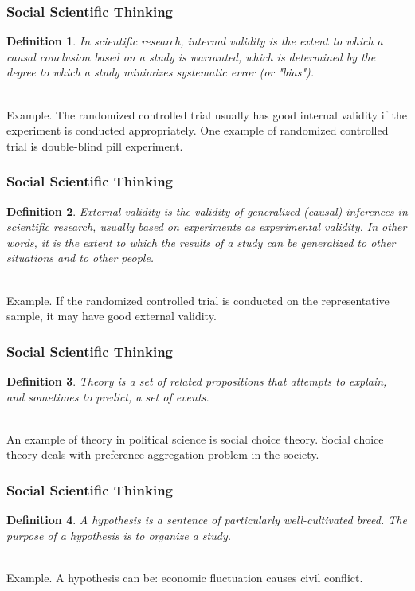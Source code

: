 \documentclass{beamer}
\newtheorem{defn}{Definition}
\numberwithin{equation}{section}
\begin{document}
\begin{frame}
\frametitle{Social Scientific Thinking}

\begin{defn}
In scientific research, internal validity is the extent to which a causal conclusion based on a study is warranted, which is determined by the degree to which a study minimizes systematic error (or "bias").
\end{defn} \pause

\ \\Example. The randomized controlled trial usually has good internal validity if the experiment is conducted appropriately. One example of randomized controlled trial is double-blind pill experiment.

\end{frame}



\begin{frame}
\frametitle{Social Scientific Thinking}

\begin{defn}
External validity is the validity of generalized (causal) inferences in scientific research, usually based on experiments as experimental validity. In other words, it is the extent to which the results of a study can be generalized to other situations and to other people.
\end{defn} \pause

\ \\Example. If the randomized controlled trial is conducted on the representative sample, it may have good external validity.

\end{frame}



\begin{frame}
\frametitle{Social Scientific Thinking}

\begin{defn}
Theory is a set of related propositions that attempts to explain, and sometimes to predict, a set of events.
\end{defn} \pause

\ \\An example of theory in political science is social choice theory. Social choice theory deals with preference aggregation problem in the society.

\end{frame}



\begin{frame}
\frametitle{Social Scientific Thinking}

\begin{defn}
A hypothesis is a sentence of particularly well-cultivated breed. The purpose of a hypothesis is to organize a study.
\end{defn} \pause

\ \\Example. A hypothesis can be: economic fluctuation causes civil conflict. 

\end{frame}
\end{document}
